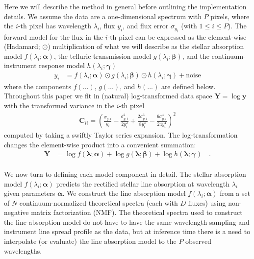 \documentclass[modern]{aastex631}
\renewcommand{\vec}[1]{\mathbf{#1}}
\newcommand{\vecalpha}{\boldsymbol{\alpha}}
\newcommand{\vecbeta}{\boldsymbol{\beta}}
\newcommand{\vecgamma}{\boldsymbol{\gamma}}
\newcommand{\hadamard}{\odot}
\begin{document}
Here we will describe the method in general before outlining the implementation details. We assume the data are a one-dimensional spectrum with $P$ pixels, where the $i$-th pixel has wavelength $\lambda_i$, flux $y_i$, and flux error $\sigma_{y_i}$ (with $1 \leq i \leq P$). The forward model for the flux in the $i$-th pixel can be expressed as the element-wise (Hadamard; $\hadamard$) multiplication of what we will describe as the stellar absorption model $f(\lambda_i; \vecalpha)$, the telluric transmission model $g(\lambda_i; \vecbeta)$, and the continuum-instrument response model $h(\lambda_i;\vecgamma)$
\begin{align}
    y_i &= f(\lambda_i;\vecalpha)\hadamard{}g(\lambda_i;\vecbeta)\hadamard{}h(\lambda_i;\vecgamma) + \mbox{noise}
\end{align}
where the components $f(...)$, $g(...)$, and $h(...)$ are defined below. Throughout this paper we fit in (natural) log-transformed data space $\vec{Y} = \log{\vec{y}}$ with the transformed variance in the $i$-th pixel
\begin{eqnarray}
    \vec{C}_{ii} = \left(\frac{\sigma_{y,i}}{y_i} - \frac{\sigma_{y,i}^2}{2y_i^2} + \frac{2\sigma_{y,i}^3}{8y_i^3} - \frac{6\sigma_{y,i}^4}{24y_i^4}\right)^2
\end{eqnarray}
\noindent{}computed by taking a swiftly Taylor series expansion. The log-transformation changes the element-wise product into a convenient summation:
\begin{align}
    \label{eq:log_y}
    \vec{Y} &= \log{f(\vec{\lambda}; \vecalpha)} + \log{g(\vec{\lambda};\vecbeta)} + \log{h(\vec{\lambda};\vecgamma)} \quad .
\end{align}\\

We now turn to defining each model component in detail.
The stellar absorption model $f(\lambda_i;\vecalpha)$ predicts the rectified stellar line absorption at wavelength $\lambda_i$ given parameters $\vecalpha$. We construct the line absorption model $f(\lambda_i;\vecalpha)$ from a set of $N$ continuum-normalized theoretical spectra (each with $D$ fluxes) using non-negative matrix factorization (NMF).
The theoretical spectra used to construct the line absorption model do not have to have the same wavelength sampling and instrument line spread profile as the data, but at inference time there is a need to interpolate (or evaluate) the line absorption model to the $P$ observed wavelengths.\\
\end{document}
